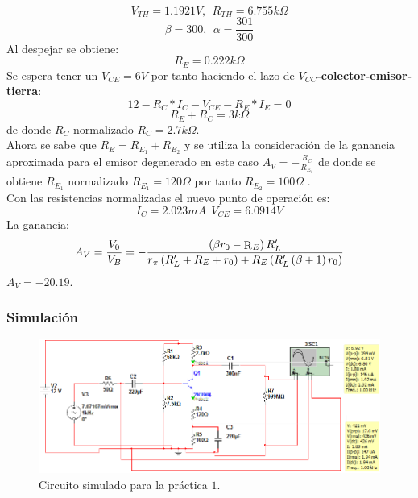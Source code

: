 \documentclass[11pt,graphicx,caption,rotating]{article}
\begin{document}
\begin{equation}
  V_{TH}= 1.1921 V,\ \ R_{TH}= 6.755 k\Omega
\label{ecu4}
\end{equation}
\begin{equation}
 \beta= 300,\ \ \alpha= \frac{301}{300}
\label{ecu5}
\end{equation}
\noindent
Al despejar se obtiene:
\begin{equation}
 R_E= 0.222 k\Omega
\label{ecu6}
\end{equation}
\noindent
Se espera tener un $V_{CE}=6 V$ por tanto haciendo el lazo de \textbf{$V_{CC}$-colector-emisor-tierra}:
\begin{equation}
 12 - R_C * I_C - V_{CE} - R_E * I_E=0
\label{ecu7}
\end{equation}
\begin{equation}
 R_E + R_C = 3 k\Omega
\label{ecu8}
\end{equation}
\noindent
de donde $R_C$ normalizado $R_C= 2.7 k\Omega$.\\
Ahora se sabe que $R_E = R_{E_1} +R_{E_2}$ y se utiliza la consideración de la ganancia aproximada para el emisor degenerado en este caso  $A_V= -\frac{R_C}{R_{E_1}}$   de donde se obtiene $R_{E_1}$ normalizado $R_{E_1}=120 \Omega$ por tanto $R_{E_2} = 100 \Omega$ .\\
Con las resistencias normalizadas el nuevo punto de operación es:
$$ I_C= 2.023  mA\ \ V_{CE}=  6.0914 V$$
\noindent
La ganancia:
\begin{equation}
 A_V  = \frac{{V_0 }}{{V_B }} =  - \frac{{\left( {\beta r_0  - {\mathop{\rm R}\nolimits} _E } \right)R'_L }}{{r_\pi  \left( {R'_L  + R_E  + r_0 } \right) + R_E \left( {R'_L \left( {\beta  + 1} \right)r_0 } \right)}}
\label{ecu9}
\end{equation}
\noindent
$A_V=-20.19$.

\subsubsection{Simulación}
\begin{figure}[H]
	\centering
		\includegraphics[scale=0.4]{circuit_lab_1.png}
	\caption{Circuito simulado para la práctica $1$.}
	\label{fig2}
\end{figure}
\end{document}
